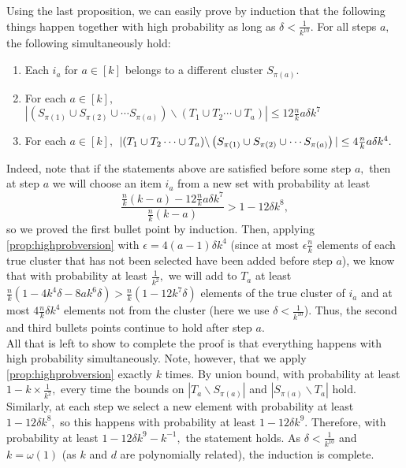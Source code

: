 \documentclass[12pt]{article}%
\begin{document}
\noindent
Using the last proposition, we can easily prove by induction that the following things happen together with high probability as long as $\delta < \frac{1}{k^{10}}.$ For all steps $a,$ the following simultaneously hold:
\begin{enumerate}
    \item Each $i_a$ for $a\in [k]$ belongs to a different cluster $S_{\pi(a)}.$
    \item For each $a\in [k],$ 
    $\left|\left(S_{\pi(1)}\cup S_{\pi(2)}\cup \cdots S_{\pi(a)}\right)\backslash \left(T_1 \cup T_2 \cdots \cup T_a\right)\right|\le 12\frac{n}{k}a\delta k^7$
    \item For each $a\in [k],$ 
     $\left|\left(T_1 \cup T_2 \cdots \cup T_a\right)\right\backslash 
     \left(S_{\pi(1)}\cup S_{\pi(2)}\cup \cdots S_{\pi(a)}\right)
     |\le 4\frac{n}{k}a\delta k^4.$
\end{enumerate}

\noindent
Indeed, note that if the statements above are satisfied before some step $a,$ then at step $a$ we will choose an item $i_a$ from a new set with probability at least 
$$
\frac{\frac{n}{k}(k -a) - 12\frac{n}{k}a\delta k^7}{\frac{n}{k}(k -a)}>
1 -12\delta k^8,
$$
so we proved the first bullet point by induction.
Then, applying \cref{prop:highprobversion} with 
$\epsilon = 4(a-1)\delta k^4$ (since at most $\epsilon\frac{n}{k}$ elements of each true cluster that has not been selected have been added before step $a$), we know that
with probability at least $\frac{1}{k^2},$ we will add to $T_a$ at least $\frac{n}{k}(1 - 4k^4\delta - 8ak^6\delta)> \frac{n}{k}(1 - 12k^7\delta)$ elements of the true cluster of $i_a$ and at most $ 4\frac{n}{k}\delta k^4$ elements not from the cluster (here we use $\delta <\frac{1}{k^{10}}$). 
Thus, the second and third bullets points continue to hold after step $a.$\\

\noindent
All that is left to show to complete the proof is that everything happens with high probability simultaneously. Note, however, that we apply \cref{prop:highprobversion} exactly $k$ times. By union bound, 
with probability at least $1 - k\times \frac{1}{k^2},$ every time the bounds on $|T_a\backslash S_{\pi(a)}|$ and 
$|S_{\pi(a)}\backslash T_a|$ hold. Similarly, at each step we select a new element with probability at least 
$1- 12\delta k^8,$ so this happens with probability at least $1- 12\delta k^9.$ Therefore, with probability at least 
$1 - 12\delta k^9 - k^{-1},$ the statement holds. As $\delta <\frac{1}{k^{10}}$ and $k = \omega(1)$ (as $k$ and $d$ are polynomially related), the induction is complete.\\
\end{document}
